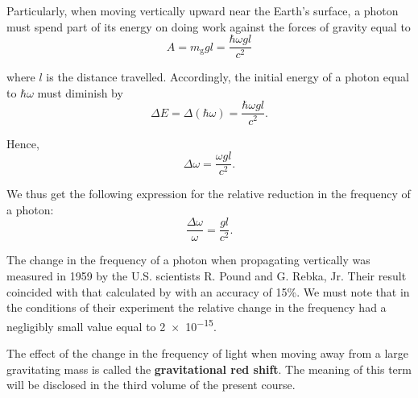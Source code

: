 \noindent
Particularly, when moving vertically upward near the Earth's surface, a photon must spend part of its energy on doing work against the forces of gravity equal to
\begin{equation*}
	A = m_{\text{g}} gl = \frac{\hbar\omega gl}{c^2}
\end{equation*}

\noindent
where $l$ is the distance travelled. Accordingly, the initial energy of a photon equal to $\hbar\omega$ must diminish by
\begin{equation*}
	\Delta E = \Delta(\hbar\omega) = \frac{\hbar\omega gl}{c^2}.
\end{equation*}

\noindent
Hence,
\begin{equation*}
	\Delta\omega = \frac{\omega gl}{c^2}.
\end{equation*}

\noindent
We thus get the following expression for the relative reduction in the frequency of a photon:
\begin{equation}\label{eq:8_61}
	\frac{\Delta\omega}{\omega} = \frac{gl}{c^2}.
\end{equation}

The change in the frequency of a photon when propagating vertically was measured in 1959 by the U.S. scientists R. Pound and G. Rebka, Jr. Their result coincided with that calculated by  with an accuracy of 15\%. We must note that in the conditions of their experiment the relative change in the frequency had a negligibly small value equal to \num{2e-15}.

The effect of the change in the frequency of light when moving away from a large gravitating mass is called the \textbf{gravitational red shift}. The meaning of this term will be disclosed in the third volume of the present course.
